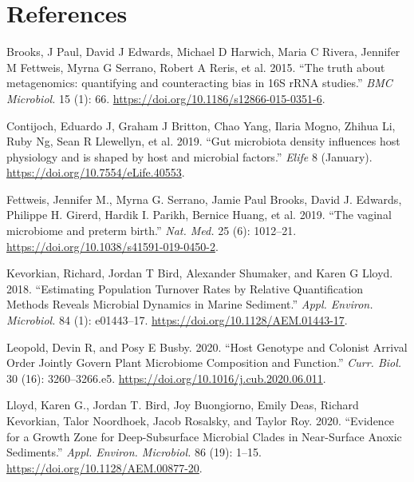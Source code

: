 \documentclass[
]{article}
\newlength{\cslhangindent}
\newlength{\cslentryspacingunit} %
\newenvironment{CSLReferences}[2] %
 {%
  \setlength{\parindent}{0pt}
  \ifodd #1
  \let\oldpar\par
  \def\par{\hangindent=\cslhangindent\oldpar}
  \fi
  \setlength{\parskip}{#2\cslentryspacingunit}
 }%
 {}
\theoremstyle{definition}
\theoremstyle{definition}
\theoremstyle{definition}
\theoremstyle{definition}
\theoremstyle{remark}
\begin{document}
\hypertarget{references}{%
\section*{References}\label{references}}

\hypertarget{refs}{}
\begin{CSLReferences}{1}{0}
\leavevmode{}%
Brooks, J Paul, David J Edwards, Michael D Harwich, Maria C Rivera, Jennifer M Fettweis, Myrna G Serrano, Robert A Reris, et al. 2015. {``{The truth about metagenomics: quantifying and counteracting bias in 16S rRNA studies}.''} \emph{BMC Microbiol.} 15 (1): 66. \url{https://doi.org/10.1186/s12866-015-0351-6}.

\leavevmode{}%
Contijoch, Eduardo J, Graham J Britton, Chao Yang, Ilaria Mogno, Zhihua Li, Ruby Ng, Sean R Llewellyn, et al. 2019. {``{Gut microbiota density influences host physiology and is shaped by host and microbial factors}.''} \emph{Elife} 8 (January). \url{https://doi.org/10.7554/eLife.40553}.

\leavevmode{}%
Fettweis, Jennifer M., Myrna G. Serrano, Jamie Paul Brooks, David J. Edwards, Philippe H. Girerd, Hardik I. Parikh, Bernice Huang, et al. 2019. {``{The vaginal microbiome and preterm birth}.''} \emph{Nat. Med.} 25 (6): 1012--21. \url{https://doi.org/10.1038/s41591-019-0450-2}.

\leavevmode{}%
Kevorkian, Richard, Jordan T Bird, Alexander Shumaker, and Karen G Lloyd. 2018. {``{Estimating Population Turnover Rates by Relative Quantification Methods Reveals Microbial Dynamics in Marine Sediment}.''} \emph{Appl. Environ. Microbiol.} 84 (1): e01443--17. \url{https://doi.org/10.1128/AEM.01443-17}.

\leavevmode{}%
Leopold, Devin R, and Posy E Busby. 2020. {``{Host Genotype and Colonist Arrival Order Jointly Govern Plant Microbiome Composition and Function}.''} \emph{Curr. Biol.} 30 (16): 3260--3266.e5. \url{https://doi.org/10.1016/j.cub.2020.06.011}.

\leavevmode{}%
Lloyd, Karen G., Jordan T. Bird, Joy Buongiorno, Emily Deas, Richard Kevorkian, Talor Noordhoek, Jacob Rosalsky, and Taylor Roy. 2020. {``{Evidence for a Growth Zone for Deep-Subsurface Microbial Clades in Near-Surface Anoxic Sediments}.''} \emph{Appl. Environ. Microbiol.} 86 (19): 1--15. \url{https://doi.org/10.1128/AEM.00877-20}.


\end{CSLReferences}
\end{document}
